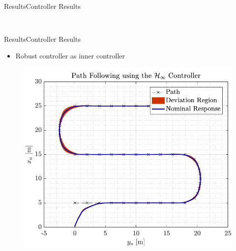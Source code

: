 \begin{frame}{Results}{Controller Results}
\begin{minipage}{0.5\linewidth}
\begin{figure}[H]
            \end{figure}               
        \end{minipage}\hfill \\    
\end{frame}

\begin{frame}{Results}{Controller Results}
    \begin{itemize}
        \item Robust controller as inner controller
    \end{itemize}
    \begin{minipage}{0.5\linewidth}
            \begin{figure}[H]
                \centering
                \includegraphics[width=1\linewidth]{figures/path_rob}
            \end{figure}       
        \end{minipage}\hfill      
    \begin{minipage}{0.5\linewidth}
            \begin{figure}[H]
                \centering

\end{figure}
\end{minipage}
\end{frame}
